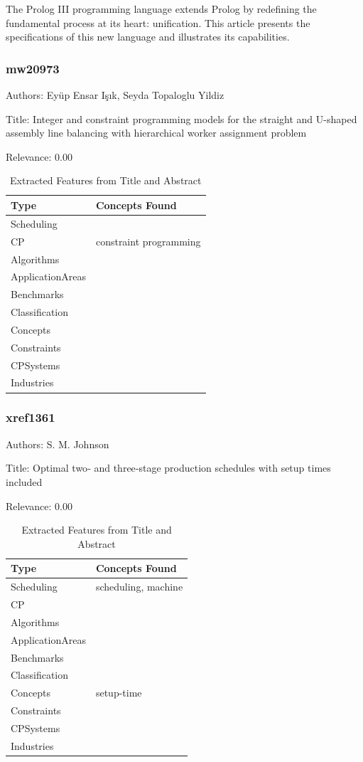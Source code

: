  The Prolog III programming language extends Prolog by redefining the fundamental process at its heart: unification. This article presents the specifications of this new language and illustrates its capabilities. 

\subsubsection{mw20973}
\label{mw:mw20973}

Authors: Eyüp Ensar Işık, Seyda Topaloglu Yildiz

Title: Integer and constraint programming models for the straight and U-shaped assembly line balancing with hierarchical worker assignment problem

Relevance:  0.00

{\scriptsize
\begin{longtable}{p{2cm}p{20cm}}
\caption{Extracted Features from Title and Abstract}\\ \toprule
Type & Concepts Found\\ \midrule
\endhead
\bottomrule
\endfoot
Scheduling & \\ 
CP & constraint programming\\ 
Algorithms & \\ 
ApplicationAreas & \\ 
Benchmarks & \\ 
Classification & \\ 
Concepts & \\ 
Constraints & \\ 
CPSystems & \\ 
Industries & \\ 
\end{longtable}
}



\subsubsection{xref1361}
\label{mw:xref1361}

Authors: S. M. Johnson

Title: Optimal two‐ and three‐stage production schedules with setup times included

Relevance:  0.00

{\scriptsize
\begin{longtable}{p{2cm}p{20cm}}
\caption{Extracted Features from Title and Abstract}\\ \toprule
Type & Concepts Found\\ \midrule
\endhead
\bottomrule
\endfoot
Scheduling & scheduling, machine\\ 
CP & \\ 
Algorithms & \\ 
ApplicationAreas & \\ 
Benchmarks & \\ 
Classification & \\ 
Concepts & setup-time\\ 
Constraints & \\ 
CPSystems & \\ 
Industries & \\ 
\end{longtable}
}

